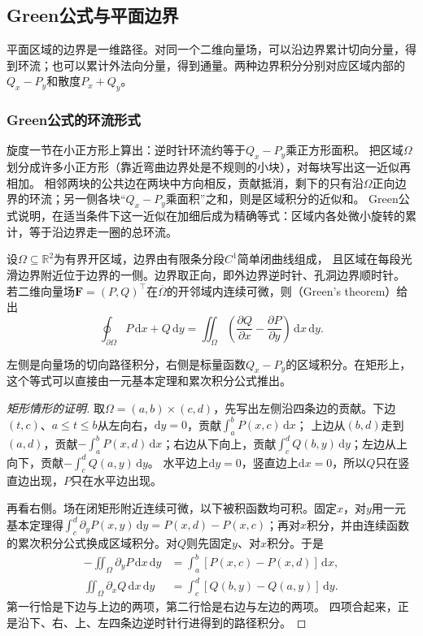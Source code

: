 \subsection{Green公式与平面边界}

平面区域的边界是一维路径。对同一个二维向量场，可以沿边界累计切向分量，得到环流；也可以累计外法向分量，得到通量。两种边界积分分别对应区域内部的$Q_x-P_y$和散度$P_x+Q_y$。

\subsubsection{Green公式的环流形式}

旋度一节在小正方形上算出：逆时针环流约等于$Q_x-P_y$乘正方形面积。
把区域$\Omega$划分成许多小正方形（靠近弯曲边界处是不规则的小块），对每块写出这一近似再相加。
相邻两块的公共边在两块中方向相反，贡献抵消，剩下的只有沿$\Omega$正向边界的环流；另一侧各块“$Q_x-P_y$乘面积”之和，则是区域积分的近似和。
Green公式说明，在适当条件下这一近似在加细后成为精确等式：区域内各处微小旋转的累计，等于沿边界走一圈的总环流。
\begin{theorem}[Green公式]
\label{thm:multivariable-green}
设$\Omega\subseteq\mathbb R^2$为有界开区域，边界由有限条分段$C^1$简单闭曲线组成，
且区域在每段光滑边界附近位于边界的一侧。边界取正向，即外边界逆时针、孔洞边界顺时针。
若二维向量场$\bm F=(P,Q)^\top$在$\overline\Omega$的开邻域内连续可微，则（Green's theorem）给出
\begin{equation}
 \oint_{\partial\Omega}P\,\mathrm dx+Q\,\mathrm dy
 =\iint_\Omega\left(\frac{\partial Q}{\partial x}-\frac{\partial P}{\partial y}\right)\,\mathrm dx\,\mathrm dy.
 \label{eq:multivariable-green}
\end{equation}
\end{theorem}
左侧是向量场的切向路径积分，右侧是标量函数$Q_x-P_y$的区域积分。在矩形上，这个等式可以直接由一元基本定理和累次积分公式推出。
\begin{proof}[矩形情形的证明]
取$\Omega=(a,b)\times(c,d)$，先写出左侧沿四条边的贡献。下边$(t,c)$、$a\leq t\leq b$从左向右，$\mathrm dy=0$，贡献$\int_a^bP(x,c)\,\mathrm dx$；
上边从$(b,d)$走到$(a,d)$，贡献$-\int_a^bP(x,d)\,\mathrm dx$；右边从下向上，贡献$\int_c^dQ(b,y)\,\mathrm dy$；左边从上向下，贡献$-\int_c^dQ(a,y)\,\mathrm dy$。
水平边上$\mathrm dy=0$，竖直边上$\mathrm dx=0$，所以$Q$只在竖直边出现，$P$只在水平边出现。

再看右侧。场在闭矩形附近连续可微，以下被积函数均可积。固定$x$，对$y$用一元基本定理得$\int_c^d\partial_yP(x,y)\,\mathrm dy=P(x,d)-P(x,c)$；再对$x$积分，并由连续函数的累次积分公式换成区域积分。对$Q$则先固定$y$、对$x$积分。于是
\[
 \begin{aligned}
 -\iint_\Omega\partial_yP\,\mathrm dx\,\mathrm dy
 &=\int_a^b[P(x,c)-P(x,d)]\,\mathrm dx,\\
 \iint_\Omega\partial_xQ\,\mathrm dx\,\mathrm dy
 &=\int_c^d[Q(b,y)-Q(a,y)]\,\mathrm dy.
 \end{aligned}
\]
第一行恰是下边与上边的两项，第二行恰是右边与左边的两项。
四项合起来，正是沿下、右、上、左四条边逆时针行进得到的路径积分。
\end{proof}
